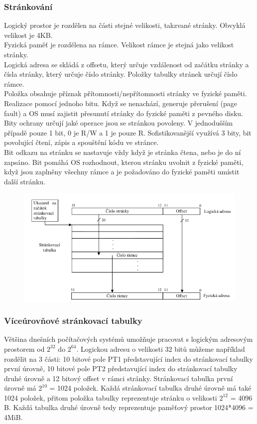 \subsubsection*{Stránkování}
Logický prostor je rozdělen na části stejné velikosti, takzvané stránky. Obvyklá velikost je 4KB.\\
Fyzická paměť je rozdělena na rámce. Velikost rámce je stejná jako velikost stránky. \\
Logická adresa se skládá z offsetu, který určuje vzdálenost od začátku stránky a čísla stránky, který určuje číslo stránky. Položky tabulky stránek určují číslo rámce.\\
Položka obsahuje příznak přítomnosti/nepřítomnosti stránky ve fyzické paměti. Realizace pomocí jednoho bitu. Když se nenachází, generuje přerušení (page fault) a OS musí zajistit přesunutí stránky do fyzické paměti z pevného disku.\\
Bity ochrany určují jaké operace jsou se stránkou povoleny. V jednodušším případě pouze 1 bit, 0 je R/W a 1 je pouze R. Sofistikovanější využívá 3 bity, bit povolující čtení, zápis a spouštění kódu ve stránce. \\
Bit odkazu na stránku se nastavuje vždy když je stránka čtena, nebo je do ní zapsáno. Bit pomáhá OS rozhodnout, kterou stránku uvolnit z fyzické paměti, když jsou zaplněny všechny rámce a je požadováno do fyzické paměti umístit další stránku. \\
\begin{figure}[h!]
    \centering
    \includegraphics[scale = 0.5]{img/Strankovani.png}
\end{figure}

\subsubsection*{Víceúrovňové stránkovací tabulky}
Většina dnešních počítačových systémů umožňuje pracovat s logickým adresovým prostorem od $2^{32}$ do $2^{64}$.
Logickou adresu o velikosti 32 bitů můžeme například rozdělit na 3 části: 10 bitové pole PT1 představující index do stránkovací tabulky první úrovně, 10 bitové pole PT2 představující index do stránkovací tabulky druhé úrovně a 12 bitový offset v rámci stránky. Stránkovací tabulka první úrovně má \(2^{10}\) = 1024 položek. Každá stránkovací tabulka druhé úrovně má také 1024 položek, přitom položka tabulky reprezentuje stránku o velikosti \(2^{12}\) = 4096 B. Každá tabulka druhé úrovně tedy reprezentuje paměťový prostor 1024*4096 = 4MiB.

